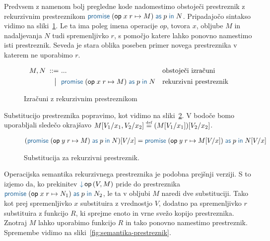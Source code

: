 Predvsem z namenom bolj pregledne kode nadomestimo obstoječi prestreznik z rekurzivnim prestreznikom $\tmwithrec{op}{x}{r}{M}{p}{N}$. Pripadajočo sintakso vidimo na sliki~\ref{fig:izrazi-prestreznik}. Le ta ima poleg imena operacije $op$, tovora $x$, obljube $M$ in nadaljevanja $N$ tudi spremenljivko $r$, s pomočjo katere lahko ponovno namestimo isti prestreznik.  Seveda je stara oblika poseben primer novega prestreznika v katerem ne uporabimo $r$.


\begin{figure}[H]
	\centering
	\small
	\begin{align*}
		M, N
		\bnfis& ...                            & &\text{obstoječi izračuni} \\
		\bnfor& \tmwithrec{op}{x}{r}{M}{p}{N}  & &\text{rekurzivni prestreznik}
	\end{align*}
	
	\caption{Izračuni z rekurzivnim prestreznikom}
	\label{fig:izrazi-prestreznik}
\end{figure}

Substitucijo prestreznika popravimo, kot vidimo na sliki~\ref{fig:substitucija-prestreznik}. V bodoče bomo uporabljali sledečo okrajšavo $M[V_1/x_1, V_2/x_2] \mathrel{\overset{\text{\tiny def}}{=}} (M[V_1/x_1])[V_2/x_2]$.

\begin{figure}[H]
	\centering
	\small
	\begin{align*}
		(\tmwithrec{op}{y}{r}{M}{p}{N})[V/x] &= \tmwithrec{op}{y}{r}{M[V/x]}{p}{N[V/x]}
	\end{align*}
	\vspace{-5ex}
	\caption{Substitucija za rekurzivni prestreznik.}
	\label{fig:substitucija-prestreznik}
\end{figure}

Operacijska semantika rekurzivnega prestreznika je podobna prejšnji verziji. S to izjemo da, ko prekinitev $\tmopin{op}{V}{M}$ pride do prestreznika $\tmwithrec{op}{x}{r}{N_1}{p}{N_2}$, le ta v obljubi $M$ naredi dve substituciji. Tako kot prej spremenljivko $x$ substituira z vrednostjo $V$, dodatno pa spremenljivko $r$ substituira z funkcijo $R$, ki sprejme enoto in vrne svežo kopijo prestreznika. Znotraj $M$ lahko uporabimo funkcijo $R$ in tako ponovno namestimo prestreznik. Spremembe vidimo na sliki~\ref{fig:semantika-prestreznik}.

